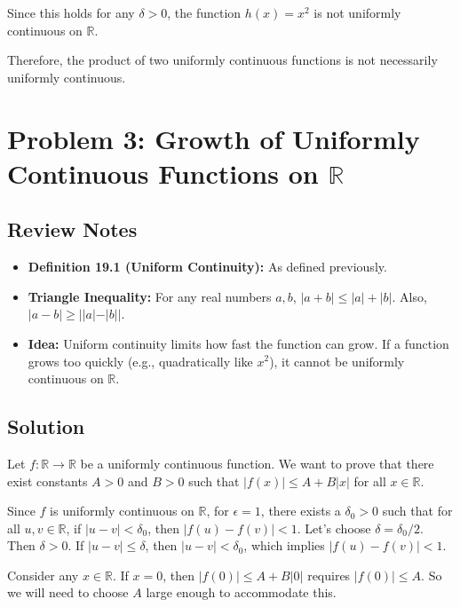 \documentclass{article}
\newcommand{\R}{\mathbb{R}}
\begin{document}
\begin{enumerate}
\begin{itemize}
            Since this holds for any \(\delta > 0\), the function \(h(x) = x^2\) is not uniformly continuous on \(\R\).
    \end{itemize}
    Therefore, the product of two uniformly continuous functions is not necessarily uniformly continuous.
\end{enumerate}

\section*{Problem 3: Growth of Uniformly Continuous Functions on \(\mathbb{R}\)}

\subsection*{Review Notes}

\begin{itemize}
    \item \textbf{Definition 19.1 (Uniform Continuity):} As defined previously.
    \item \textbf{Triangle Inequality:} For any real numbers \(a, b\), \(|a+b| \le |a| + |b|\). Also, \(|a-b| \ge ||a| - |b||\).
    \item \textbf{Idea:} Uniform continuity limits how fast the function can grow. If a function grows too quickly (e.g., quadratically like \(x^2\)), it cannot be uniformly continuous on \(\mathbb{R}\).
\end{itemize}

\subsection*{Solution}

Let \(f: \R \to \R\) be a uniformly continuous function. We want to prove that there exist constants \(A > 0\) and \(B > 0\) such that \(|f(x)| \le A + B|x|\) for all \(x \in \R\).

Since \(f\) is uniformly continuous on \(\R\), for \(\epsilon = 1\), there exists a \(\delta_0 > 0\) such that for all \(u, v \in \R\), if \(|u-v| < \delta_0\), then \(|f(u) - f(v)| < 1\).
Let's choose \(\delta = \delta_0/2\). Then \(\delta > 0\). If \(|u-v| \le \delta\), then \(|u-v| < \delta_0\), which implies \(|f(u) - f(v)| < 1\).

Consider any \(x \in \R\).
If \(x = 0\), then \(|f(0)| \le A + B|0|\) requires \(|f(0)| \le A\). So we will need to choose \(A\) large enough to accommodate this.
\end{document}
